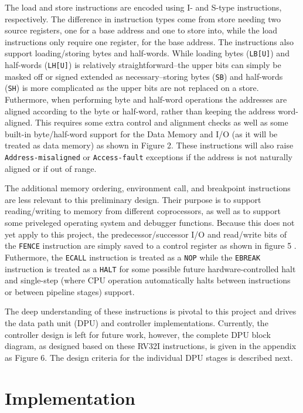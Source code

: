 \documentclass[lettersize,journal]{IEEEtran}
\begin{document}
The load and store instructions are encoded using I- and S-type instructions, respectively.
The difference in instruction types come from store needing two source registers, one for a base address and one to store into, while the load instructions only require one register, for the base address.
The instructions also support loading/storing bytes and half-words.
While loading bytes (\verb|LB[U]|) and half-words (\verb|LH[U]|) is relatively straightforward--the upper bits can simply be masked off or signed extended as necessary--storing bytes (\verb|SB|) and half-words (\verb|SH|) is more complicated as the upper bits are not replaced on a store.
Futhermore, when performing byte and half-word operations the addresses are aligned according to the byte or half-word, rather than keeping the address word-aligned.
This requires some extra control and alignment checks as well as some built-in byte/half-word support for the Data Memory and I/O (as it will be treated as data memory) as shown in Figure 2.
These instructions will also raise \verb|Address-misaligned| or \verb|Access-fault| exceptions if the address is not naturally aligned or if out of range.

The additional memory ordering, environment call, and breakpoint instructions are less relevant to this preliminary design.
Their purpose is to support reading/writing to memory from different coprocessors, as well as to support some priveleged operating system and debugger functions.
Because this does not yet apply to this project, the predecessor/successor I/O and read/write bits of the \verb|FENCE| instruction are simply saved to a control register as shown in figure 5 \cite{riscvunprovisioned}.
Futhermore, the \verb|ECALL| instruction is treated as a \verb|NOP| while the \verb|EBREAK| instruction is treated as a \verb|HALT| for some possible future hardware-controlled halt and single-step (where CPU operation automatically halts between instructions or between pipeline stages) support.

The deep understanding of these instructions is pivotal to this project and drives the data path unit (DPU) and controller implementations.
Currently, the controller design is left for future work, however, the complete DPU block diagram, as designed based on these RV32I instructions, is given in the appendix as Figure 6.
The design criteria for the individual DPU stages is described next.

\section{Implementation}
\end{document}
